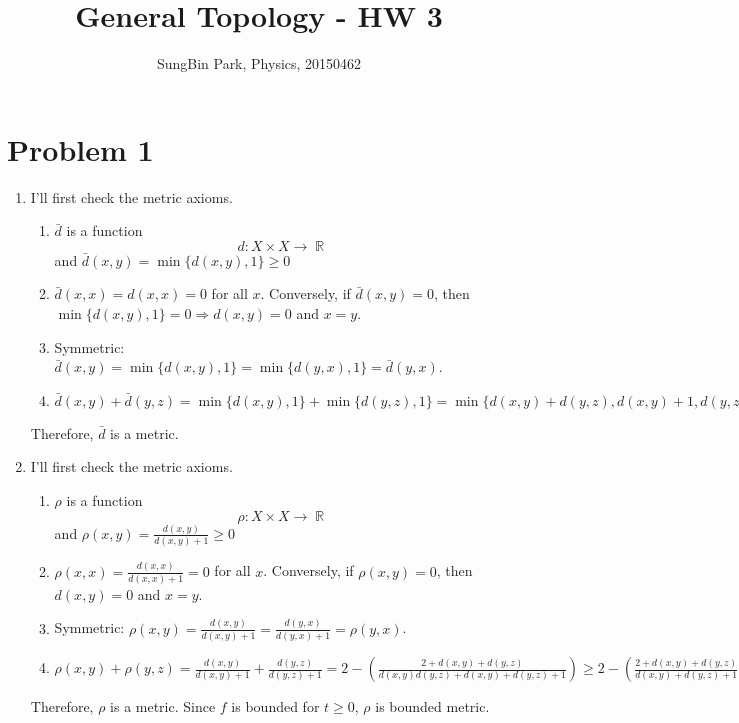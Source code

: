 \documentclass{article}
\DeclareMathOperator{\rr}{\mathbb{R}}
\begin{document}
\title{General Topology - HW 3}
\author{SungBin Park, Physics, 20150462} 

 \maketitle
\section*{Problem 1}
\begin{enumerate}
\item[A.] I'll first check the metric axioms.
\begin{enumerate}
\item $\bar{d}$ is a function
\begin{equation*}
d:X\times X\longrightarrow \rr
\end{equation*}
and $\bar{d}(x,y)=\min\{d(x,y), 1\}\geq 0$
\item $\bar{d}(x,x)=d(x, x)=0$ for all $x$. Conversely, if $\bar{d}(x,y)=0$, then $\min\{d(x,y), 1\}=0\Rightarrow d(x,y)=0$ and $x=y$.
\item Symmetric: $\bar{d}(x,y)=\min\{d(x,y), 1\}=\min\{d(y,x), 1\}=\bar{d}(y,x)$.
\item $\bar{d}(x,y)+\bar{d}(y,z)=\min\{d(x,y), 1\}+\min\{d(y,z), 1\}= \min\{d(x,y)+d(y,z), d(x,y)+1, d(y,z)+1, 2\}\geq \min\{d(x,y)+d(y,z), 1\}\geq \min\{d(x,z), 1\}=\bar{d}(x,z)$
\end{enumerate}
Therefore, $\bar{d}$ is a metric.
\item[B.] I'll first check the metric axioms.
\begin{enumerate}
\item $\rho$ is a function
\begin{equation*}
\rho:X\times X\longrightarrow \rr
\end{equation*}
and $\rho(x,y)=\frac{d(x, y)}{d(x,y)+1}\geq 0$
\item $\rho(x,x)=\frac{d(x, x)}{d(x,x)+1}=0$ for all $x$. Conversely, if $\rho(x,y)=0$, then $d(x,y)=0$ and $x=y$.
\item Symmetric: $\rho(x,y)=\frac{d(x,y)}{d(x,y)+1}=\frac{d(y,x)}{d(y,x)+1}=\rho(y,x)$.
\item $\rho(x,y)+\rho(y,z)=\frac{d(x, y)}{d(x,y)+1}+\frac{d(y, z)}{d(y,z)+1}=2- \left(\frac{2+d(x, y)+d(y, z)}{d(x,y)d(y,z)+d(x,y)+d(y,z)+1}\right)\geq 2- \left(\frac{2+d(x, y)+d(y, z)}{d(x,y)+d(y,z)+1}\right)=2- \left(1+\frac{1}{d(x,y)+d(y,z)+1}\right)\geq 2- \left(1+\frac{1}{d(x,z)+1}\right)=\rho(x,z)$
\end{enumerate}
Therefore, $\rho$ is a metric. Since $f$ is bounded for $t\geq 0$, $\rho$ is bounded metric.
\end{enumerate}
\end{document}
